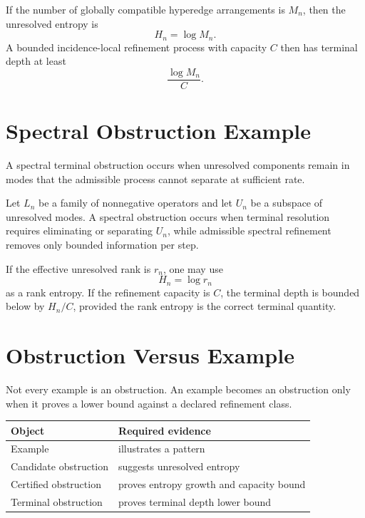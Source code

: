 If the number of globally compatible hyperedge arrangements is \(M_n\), then
the unresolved entropy is
\[
H_n=\log M_n.
\]
A bounded incidence-local refinement process with capacity \(C\) then has
terminal depth at least
\[
\frac{\log M_n}{C}.
\]

\section{Spectral Obstruction Example}

A spectral terminal obstruction occurs when unresolved components remain in
modes that the admissible process cannot separate at sufficient rate.

\begin{definition}
Let \(L_n\) be a family of nonnegative operators and let \(U_n\) be a subspace
of unresolved modes. A spectral obstruction occurs when terminal resolution
requires eliminating or separating \(U_n\), while admissible spectral
refinement removes only bounded information per step.
\end{definition}

If the effective unresolved rank is \(r_n\), one may use
\[
H_n=\log r_n
\]
as a rank entropy. If the refinement capacity is \(C\), the terminal depth is
bounded below by \(H_n/C\), provided the rank entropy is the correct terminal
quantity.

\section{Obstruction Versus Example}

Not every example is an obstruction. An example becomes an obstruction only
when it proves a lower bound against a declared refinement class.

\begin{center}
\begin{tabular}{ll}
\toprule
Object & Required evidence \\
\midrule
Example & illustrates a pattern \\
Candidate obstruction & suggests unresolved entropy \\
Certified obstruction & proves entropy growth and capacity bound \\
Terminal obstruction & proves terminal depth lower bound \\
\bottomrule
\end{tabular}
\end{center}

